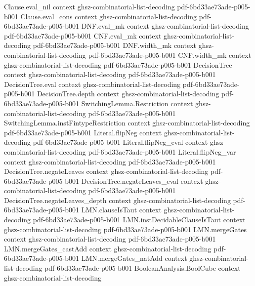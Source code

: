 \begin{lemma}
  {Clause.eval_nil}
  {context}
  {ghsz-combinatorial-list-decoding}
  {pdf-6bd33ae73ade-p005-b001}
\proofstep
  {Clause.eval_cons}
  {context}
  {ghsz-combinatorial-list-decoding}
  {pdf-6bd33ae73ade-p005-b001}
\proofstep
  {DNF.eval_mk}
  {context}
  {ghsz-combinatorial-list-decoding}
  {pdf-6bd33ae73ade-p005-b001}
\proofstep
  {CNF.eval_mk}
  {context}
  {ghsz-combinatorial-list-decoding}
  {pdf-6bd33ae73ade-p005-b001}
\proofstep
  {DNF.width_mk}
  {context}
  {ghsz-combinatorial-list-decoding}
  {pdf-6bd33ae73ade-p005-b001}
\proofstep
  {CNF.width_mk}
  {context}
  {ghsz-combinatorial-list-decoding}
  {pdf-6bd33ae73ade-p005-b001}
\proofstep
  {DecisionTree}
  {context}
  {ghsz-combinatorial-list-decoding}
  {pdf-6bd33ae73ade-p005-b001}
\proofstep
  {DecisionTree.eval}
  {context}
  {ghsz-combinatorial-list-decoding}
  {pdf-6bd33ae73ade-p005-b001}
\proofstep
  {DecisionTree.depth}
  {context}
  {ghsz-combinatorial-list-decoding}
  {pdf-6bd33ae73ade-p005-b001}
\proofstep
  {SwitchingLemma.Restriction}
  {context}
  {ghsz-combinatorial-list-decoding}
  {pdf-6bd33ae73ade-p005-b001}
\proofstep
  {SwitchingLemma.instFintypeRestriction}
  {context}
  {ghsz-combinatorial-list-decoding}
  {pdf-6bd33ae73ade-p005-b001}
\proofstep
  {Literal.flipNeg}
  {context}
  {ghsz-combinatorial-list-decoding}
  {pdf-6bd33ae73ade-p005-b001}
\proofstep
  {Literal.flipNeg_eval}
  {context}
  {ghsz-combinatorial-list-decoding}
  {pdf-6bd33ae73ade-p005-b001}
\proofstep
  {Literal.flipNeg_var}
  {context}
  {ghsz-combinatorial-list-decoding}
  {pdf-6bd33ae73ade-p005-b001}
\proofstep
  {DecisionTree.negateLeaves}
  {context}
  {ghsz-combinatorial-list-decoding}
  {pdf-6bd33ae73ade-p005-b001}
\proofstep
  {DecisionTree.negateLeaves_eval}
  {context}
  {ghsz-combinatorial-list-decoding}
  {pdf-6bd33ae73ade-p005-b001}
\proofstep
  {DecisionTree.negateLeaves_depth}
  {context}
  {ghsz-combinatorial-list-decoding}
  {pdf-6bd33ae73ade-p005-b001}
\proofstep
  {LMN.clauseIsTaut}
  {context}
  {ghsz-combinatorial-list-decoding}
  {pdf-6bd33ae73ade-p005-b001}
\proofstep
  {LMN.instDecidableClauseIsTaut}
  {context}
  {ghsz-combinatorial-list-decoding}
  {pdf-6bd33ae73ade-p005-b001}
\proofstep
  {LMN.mergeGates}
  {context}
  {ghsz-combinatorial-list-decoding}
  {pdf-6bd33ae73ade-p005-b001}
\proofstep
  {LMN.mergeGates_castAdd}
  {context}
  {ghsz-combinatorial-list-decoding}
  {pdf-6bd33ae73ade-p005-b001}
\proofstep
  {LMN.mergeGates_natAdd}
  {context}
  {ghsz-combinatorial-list-decoding}
  {pdf-6bd33ae73ade-p005-b001}
\proofstep
  {BooleanAnalysis.BoolCube}
  {context}
  {ghsz-combinatorial-list-decoding}

\end{lemma}
